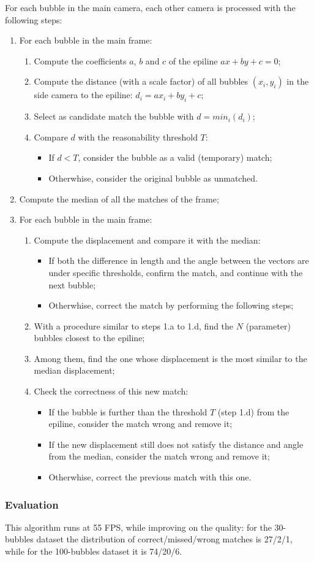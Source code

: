 For each bubble in the main camera, each other camera is processed with the following steps:
\begin{enumerate}
	\itemsep 0em
	\item For each bubble in the main frame:
	      \begin{enumerate}
		      \item Compute the coefficients $a$, $b$ and $c$ of the epiline $ax+by+c{=}0$;
		      \item Compute the distance (with a scale factor) of all bubbles $(x_i, y_i)$ in the side camera to the epiline: $d_i = ax_i + by_i + c$;
		      \item Select as candidate match the bubble with $d=min_i(d_i)$;
		      \item Compare $d$ with the reasonability threshold $T$:
		            \begin{itemize}
			            \item If $d<T$, consider the bubble as a valid (temporary) match;
			            \item Otherwhise, consider the original bubble as unmatched.
		            \end{itemize}
	      \end{enumerate}
	\item Compute the median of all the matches of the frame;
	\item For each bubble in the main frame:
	      \begin{enumerate}
		      \item Compute the displacement and compare it with the median:
		            \begin{itemize}
			            \item If both the difference in length and the angle between the vectors are under specific thresholds, confirm the match, and continue with the next bubble;
			            \item Otherwhise, correct the match by performing the following steps;
		            \end{itemize}
		      \item With a procedure similar to steps 1.a to 1.d, find the $N$ (parameter) bubbles closest to the epiline;
		      \item Among them, find the one whose displacement is the most similar to the median displacement;
		      \item Check the correctness of this new match:
		      \begin{itemize}
				\item If the bubble is further than the threshold $T$ (step 1.d) from the epiline, consider the match wrong and remove it;
				\item If the new displacement still does not satisfy the distance and angle from the median, consider the match wrong and remove it;
				\item Otherwhise, correct the previous match with this one.
			  \end{itemize}
	      \end{enumerate}
\end{enumerate}

\subsubsection{Evaluation}

This algorithm runs at 55 FPS, while improving on the quality: for the 30-bubbles dataset the distribution of correct/missed/wrong matches is 27/2/1, while for the 100-bubbles dataset it is 74/20/6.
